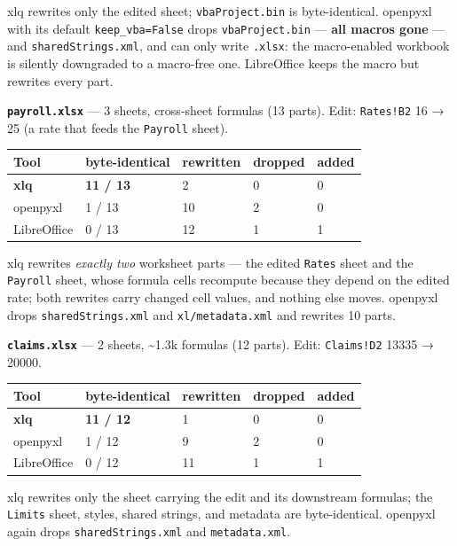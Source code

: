\documentclass[
]{article}
\newcounter{none} %
\begin{document}
xlq rewrites only the edited sheet; \texttt{vbaProject.bin} is
byte-identical. openpyxl with its default \texttt{keep\_vba=False} drops
\texttt{vbaProject.bin} --- \textbf{all macros gone} --- and
\texttt{sharedStrings.xml}, and can only write \texttt{.xlsx}: the
macro-enabled workbook is silently downgraded to a macro-free one.
LibreOffice keeps the macro but rewrites every part.

\textbf{\texttt{payroll.xlsx}} --- 3 sheets, cross-sheet formulas (13
parts). Edit: \texttt{Rates!B2} 16 → 25 (a rate that feeds the
\texttt{Payroll} sheet).

{\def\LTcaptype{none} %
\begin{longtable}[]{@{}lllll@{}}
\toprule\noalign{}
Tool & byte-identical & rewritten & dropped & added \\
\midrule\noalign{}
\endhead
\bottomrule\noalign{}
\endlastfoot
\textbf{xlq} & \textbf{11 / 13} & 2 & 0 & 0 \\
openpyxl & 1 / 13 & 10 & 2 & 0 \\
LibreOffice & 0 / 13 & 12 & 1 & 1 \\
\end{longtable}
}

xlq rewrites \emph{exactly two} worksheet parts --- the edited
\texttt{Rates} sheet and the \texttt{Payroll} sheet, whose formula cells
recompute because they depend on the edited rate; both rewrites carry
changed cell values, and nothing else moves. openpyxl drops
\texttt{sharedStrings.xml} and \texttt{xl/metadata.xml} and rewrites 10
parts.

\textbf{\texttt{claims.xlsx}} --- 2 sheets, \textasciitilde1.3k formulas
(12 parts). Edit: \texttt{Claims!D2} 13335 → 20000.

{\def\LTcaptype{none} %
\begin{longtable}[]{@{}lllll@{}}
\toprule\noalign{}
Tool & byte-identical & rewritten & dropped & added \\
\midrule\noalign{}
\endhead
\bottomrule\noalign{}
\endlastfoot
\textbf{xlq} & \textbf{11 / 12} & 1 & 0 & 0 \\
openpyxl & 1 / 12 & 9 & 2 & 0 \\
LibreOffice & 0 / 12 & 11 & 1 & 1 \\
\end{longtable}
}

xlq rewrites only the sheet carrying the edit and its downstream
formulas; the \texttt{Limits} sheet, styles, shared strings, and
metadata are byte-identical. openpyxl again drops
\texttt{sharedStrings.xml} and \texttt{metadata.xml}.
\end{document}
